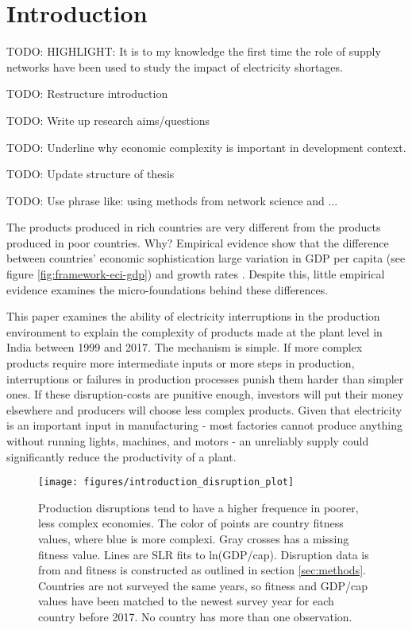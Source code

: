 \documentclass[11pt]{article}
\begin{document}
% 






\section{Introduction}\label{sec:introduction}

TODO: HIGHLIGHT: It is to my knowledge the first time the role of supply networks have been used to study the impact of electricity shortages.

TODO: Restructure introduction

TODO: Write up research aims/questions

TODO: Underline why economic complexity is important in development context.

TODO: Update structure of thesis

TODO: Use phrase like: using methods from network science and ...

The products produced in rich countries are very different from the products produced in poor countries. Why? Empirical evidence show that the difference between countries' economic sophistication large variation in GDP per capita (see figure \ref{fig:framework-eci-gdp}) and growth rates \citep{tacchella_dynamical_2018}. Despite this, little empirical evidence examines the micro-foundations behind these differences. 

This paper examines the ability of electricity interruptions in the production environment to explain the complexity of products made at the plant level in India between 1999 and 2017. The mechanism is simple. If more complex products require more intermediate inputs or more steps in production, interruptions or failures in production processes punish them harder than simpler ones. If these disruption-costs are punitive enough, investors will put their money elsewhere and producers will choose less complex products. Given that electricity is an important input in manufacturing -  most factories cannot produce anything without running lights, machines, and motors - an unreliably supply could significantly reduce the productivity of a plant.

\begin{figure}[htpb]
	\centering
	\texttt{[image: figures/introduction\_disruption\_plot]}
	\caption{Production disruptions tend to have a higher frequence in poorer, less complex economies. The color of points are country fitness values, where blue is more complexi. Gray crosses has a missing fitness value. Lines are SLR fits to ln(GDP/cap). Disruption data is from \cite{world_bank_enterprise_2020} and fitness is constructed as outlined in section \ref{sec:methods}. Countries are not surveyed the same years, so fitness and GDP/cap values have been matched to the newest survey year for each country before 2017. No country has more than one observation.}
	\label{fig:disruption-fig}
\end{figure}
\end{document}
